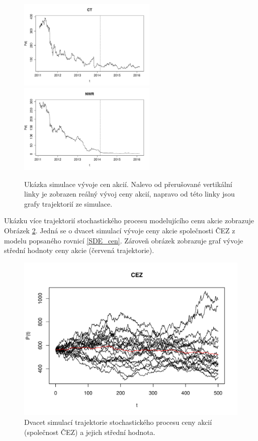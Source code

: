 \documentclass[a4paper,12pt]{report}
\theoremstyle{definition} \newtheorem{definice}[veta]{Definice}
\theoremstyle{remark}
\begin{document}
\begin{figure}[!htbp]
	\includegraphics[width=6.6cm, clip, trim= 0 15 25 0]{IMG/ds_ct_v4.pdf}\\
	\includegraphics[width=6.6cm, clip, trim= 0 15 25 0]{IMG/ds_nwr_v4.pdf}	
  \caption{Ukázka simulace vývoje cen akcií. Nalevo od přerušované vertikální linky je zobrazen reálný vývoj ceny akcií, napravo od této linky jsou grafy trajektorií ze simulace.}  \label{model_cen_jednotlive}
\end{figure}


Ukázku více trajektorií stochastického procesu modelujícího cenu akcie zobrazuje Obrázek \ref{avg_trajektorie}.
Jedná se o dvacet simulací vývoje ceny akcie společnosti ČEZ z modelu popsaného rovnicí \eqref{SDE_cen}.
Zároveň obrázek zobrazuje graf vývoje střední hodnoty ceny akcie (červená trajektorie).

\begin{figure}[!htbp]
  \centering 
	\includegraphics[width=13.5cm, clip, trim= 0 15 25 50]{IMG/avg_CEZ_v1.pdf}
  \caption{Dvacet simulací trajektorie stochastického procesu ceny akcií (společnost ČEZ) a jejich střední hodnota.}  \label{avg_trajektorie}
\end{figure}
\end{document}

